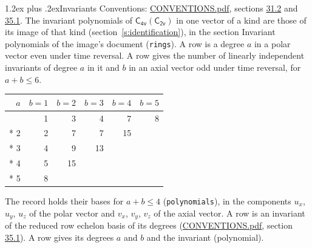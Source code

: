 \documentclass[10pt,a4paper]{article}
\makeatletter
\renewcommand\section{\@startsection{section}{1}{\z@}{-3ex plus -1ex minus -.2ex}%
  {1.2ex plus .2ex}{\normalfont\large\sffamily\bfseries\color{parttitle}}}
\numberwithin{equation}{section}
\newcommand{\grp}[1]{\mathsf{#1}}
\makeatother
\begin{document}
\section{Invariants}\label{s:invariants}
Conventions: \href{../../CONVENTIONS.pdf}{CONVENTIONS.pdf}, sections \href{../../CONVENTIONS.pdf\#conv.31.2}{31.2} and \href{../../CONVENTIONS.pdf\#conv.35.1}{35.1}.
The invariant polynomials of $\grp{C_{4v}}(\grp{C_{2v}})$ in one vector of a kind are those of its image of that kind (section~\ref{s:identification}), in the section Invariant polynomials of the image's document (\texttt{rings}).
\leavevmode\label{n:index.degree.polar}\label{n:index.degree.axial}A row is a degree $a$ in a polar vector even under time reversal. A row gives the number of linearly independent invariants of degree $a$ in it and $b$ in an axial vector odd under time reversal, for $a + b \le 6$.
{\small\begin{longtable}{@{}rrrrrr@{}}\toprule
$a$ & $b = 1$ & $b = 2$ & $b = 3$ & $b = 4$ & $b = 5$\\\midrule\endhead
\bottomrule\endfoot\endlastfoot
1 & 1 & 3 & 4 & 7 & 8\\*
2 & 2 & 7 & 7 & 15 & \\*
3 & 4 & 9 & 13 &  & \\*
4 & 5 & 15 &  &  & \\*
5 & 8 &  &  &  & \\
\bottomrule\end{longtable}}
\leavevmode\label{n:local.component.polar}\label{n:local.component.axial}The record holds their bases for $a + b \le 4$ (\texttt{polynomials}), in the components $u_{x}$, $u_{y}$, $u_{z}$ of the polar vector and $v_{x}$, $v_{y}$, $v_{z}$ of the axial vector. \label{n:head.polynomial}A row is an invariant of the reduced row echelon basis of its degrees (\href{../../CONVENTIONS.pdf}{CONVENTIONS.pdf}, section \href{../../CONVENTIONS.pdf\#conv.35.1}{35.1}). A row gives its degrees $a$ and $b$ and the invariant (polynomial).
\end{document}
